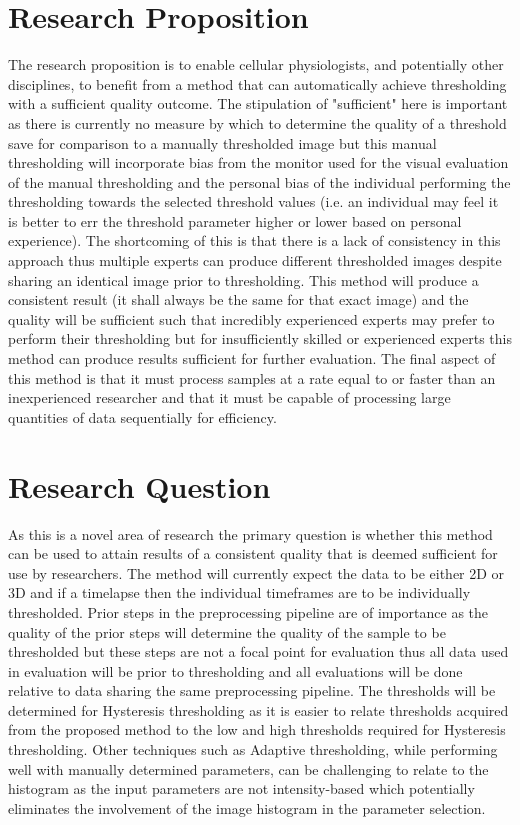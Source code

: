 \section{Research Proposition}
The research proposition is to enable cellular physiologists, and potentially other disciplines, to benefit from a method that can automatically achieve thresholding with a sufficient quality outcome. The stipulation of "sufficient" here is important as there is currently no measure by which to determine the quality of a threshold save for comparison to a manually thresholded image but this manual thresholding will incorporate bias from the monitor used for the visual evaluation of the manual thresholding and the personal bias of the individual performing the thresholding towards the selected threshold values (i.e. an individual may feel it is better to err the threshold parameter higher or lower based on personal experience). The shortcoming of this is that there is a lack of consistency in this approach thus multiple experts can produce different thresholded images despite sharing an identical image prior to thresholding. This method will produce a consistent result (it shall always be the same for that exact image) and the quality will be sufficient such that incredibly experienced experts may prefer to perform their thresholding but for insufficiently skilled or experienced experts this method can produce results sufficient for further evaluation. The final aspect of this method is that it must process samples at a rate equal to or faster than an inexperienced researcher and that it must be capable of processing large quantities of data sequentially for efficiency.
\section{Research Question}
As this is a novel area of research the primary question is whether this method can be used to attain results of a consistent quality that is deemed sufficient for use by researchers. The method will currently expect the data to be either 2D or 3D and if a timelapse then the individual timeframes are to be individually thresholded. Prior steps in the preprocessing pipeline are of importance as the quality of the prior steps will determine the quality of the sample to be thresholded but these steps are not a focal point for evaluation thus all data used in evaluation will be prior to thresholding and all evaluations will be done relative to data sharing the same preprocessing pipeline. The thresholds will be determined for Hysteresis thresholding as it is easier to relate thresholds acquired from the proposed method to the low and high thresholds required for Hysteresis thresholding. Other techniques such as Adaptive thresholding, while performing well with manually determined parameters, can be challenging to relate to the histogram as the input parameters are not intensity-based which potentially eliminates the involvement of the image histogram in the parameter selection.

